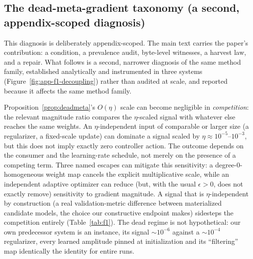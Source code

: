 \documentclass[10pt,letterpaper]{article}
\theoremstyle{remark}
\begin{document}
\subsection{The dead-meta-gradient taxonomy (a second, appendix-scoped
diagnosis)}
\label{sec:deadmeta-taxonomy}

This diagnosis is deliberately appendix-scoped. The main text carries the
paper's contribution: a condition, a prevalence audit, byte-level witnesses, a
harvest law, and a repair. What follows is a second, narrower
diagnosis of the same method family, established analytically and instrumented
in three systems (Figure~\ref{fig:app-f1-decoupling}) rather than audited at
scale, and reported because it affects the same method family.

Proposition~\ref{prop:deadmeta}'s $O(\eta)$ scale can become negligible in
\emph{competition}: the relevant magnitude ratio compares the $\eta$-scaled
signal with whatever else reaches the same weights. An $\eta$-independent
input of comparable or larger size (a regularizer, a fixed-scale update)
can dominate a signal scaled by $\eta\approx10^{-5}$--$10^{-3}$, but this
does not imply exactly zero controller action. The outcome depends on the
consumer and the learning-rate schedule, not merely on the presence of a
competing term. Three named escapes can mitigate this sensitivity: a degree-0-homogeneous weight map
cancels the explicit multiplicative scale, while an independent adaptive
optimizer can reduce (but, with the usual $\epsilon>0$, does not exactly
remove) sensitivity to gradient magnitude. A signal that is
$\eta$-independent by construction (a real validation-metric difference
between materialized candidate models, the choice our constructive endpoint
makes) sidesteps the competition entirely (Table~\ref{tab:f1}). The dead
regime is not hypothetical: our own predecessor system is an instance, its
signal ${\sim}10^{-6}$ against a ${\sim}10^{-4}$ regularizer, every learned
amplitude pinned at initialization and its ``filtering'' map identically the
identity for entire runs.
\end{document}
